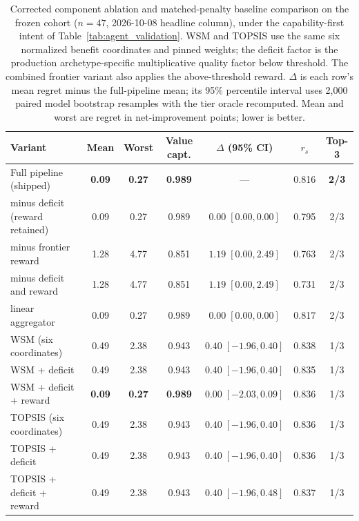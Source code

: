 \documentclass[pdflatex,sn-mathphys-num]{sn-jnl}
\theoremstyle{thmstyleone}
\theoremstyle{thmstylethree}
\begin{document}
\begin{table}[!htbp]
\caption{Corrected component ablation and matched-penalty baseline comparison on the frozen cohort ($n{=}47$, 2026-10-08 headline column), under the capability-first intent of Table~\ref{tab:agent_validation}. WSM and TOPSIS use the same six normalized benefit coordinates and pinned weights; the deficit factor is the production archetype-specific multiplicative quality factor below threshold. The combined frontier variant also applies the above-threshold reward. $\Delta$ is each row's mean regret minus the full-pipeline mean; its 95\% percentile interval uses 2{,}000 paired model bootstrap resamples with the tier oracle recomputed. Mean and worst are regret in net-improvement points; lower is better.}\label{tab:component_ablation}
\centering
\footnotesize
\setlength{\tabcolsep}{2pt}
\begin{tabular*}{\linewidth}{@{\extracolsep{\fill}}lcccccc@{}}
\toprule
\textbf{Variant} & \textbf{Mean} & \textbf{Worst} & \textbf{Value capt.} & \textbf{$\Delta$ (95\% CI)} & \textbf{$r_s$} & \textbf{Top-3} \\
\midrule
Full pipeline (shipped)            & \textbf{0.09} & \textbf{0.27} & \textbf{0.989} & --- & 0.816 & \textbf{2/3} \\
minus deficit (reward retained)    & 0.09 & 0.27 & 0.989 & $0.00\;[0.00,0.00]$ & 0.795 & 2/3 \\
minus frontier reward              & 1.28 & 4.77 & 0.851 & $1.19\;[0.00,2.49]$ & 0.763 & 2/3 \\
minus deficit and reward           & 1.28 & 4.77 & 0.851 & $1.19\;[0.00,2.49]$ & 0.731 & 2/3 \\
linear aggregator                  & 0.09 & 0.27 & 0.989 & $0.00\;[0.00,0.00]$ & 0.817 & 2/3 \\
\midrule
WSM (six coordinates)              & 0.49 & 2.38 & 0.943 & $0.40\;[-1.96,0.40]$ & 0.838 & 1/3 \\
WSM + deficit                      & 0.49 & 2.38 & 0.943 & $0.40\;[-1.96,0.40]$ & 0.835 & 1/3 \\
WSM + deficit + reward             & \textbf{0.09} & \textbf{0.27} & \textbf{0.989} & $0.00\;[-2.03,0.09]$ & 0.836 & 1/3 \\
TOPSIS (six coordinates)           & 0.49 & 2.38 & 0.943 & $0.40\;[-1.96,0.40]$ & 0.836 & 1/3 \\
TOPSIS + deficit                   & 0.49 & 2.38 & 0.943 & $0.40\;[-1.96,0.40]$ & 0.836 & 1/3 \\
TOPSIS + deficit + reward          & 0.49 & 2.38 & 0.943 & $0.40\;[-1.96,0.48]$ & 0.837 & 1/3 \\
\bottomrule
\end{tabular*}
\end{table}
\end{document}
